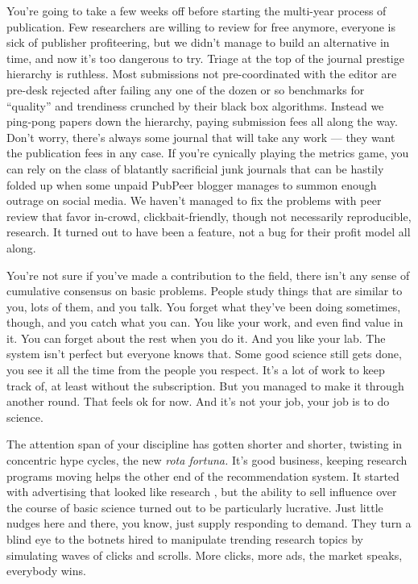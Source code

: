 You're going to take a few weeks off before starting the multi-year
process of publication. Few researchers are willing to review for free
anymore, everyone is sick of publisher profiteering, but we didn't
manage to build an alternative in time, and now it's too dangerous to
try. Triage at the top of the journal prestige hierarchy is ruthless.
Most submissions not pre-coordinated with the editor are pre-desk
rejected after failing any one of the dozen or so benchmarks for
``quality'' and trendiness crunched by their black box algorithms.
Instead we ping-pong papers down the hierarchy, paying submission fees
all along the way. Don't worry, there's always some journal that will
take any work --- they want the publication fees in any case. If you're
cynically playing the metrics game, you can rely on the class of
blatantly sacrificial junk journals that can be hastily folded up when
some unpaid PubPeer blogger manages to summon enough outrage on social
media. We haven't managed to fix the problems with peer review that
favor in-crowd, clickbait-friendly, though not necessarily reproducible,
research. It turned out to have been a feature, not a bug for their
profit model all along.

You're not sure if you've made a contribution to the field, there isn't
any sense of cumulative consensus on basic problems. People study things
that are similar to you, lots of them, and you talk. You forget what
they've been doing sometimes, though, and you catch what you can. You
like your work, and even find value in it. You can forget about the rest
when you do it. And you like your lab. The system isn't perfect but
everyone knows that. Some good science still gets done, you see it all
the time from the people you respect. It's a lot of work to keep track
of, at least without the subscription. But you managed to make it
through another round. That feels ok for now. And it's not your job,
your job is to do science.

The attention span of your discipline has gotten shorter and shorter,
twisting in concentric hype cycles, the new \emph{rota fortuna.} It's
good business, keeping research programs moving helps the other end of
the recommendation system. It started with advertising that looked like
research \citep{elsevier360AdvertisingSolutions} , but the ability
to sell influence over the course of basic science turned out to be
particularly lucrative. Just little nudges here and there, you know,
just supply responding to demand. They turn a blind eye to the botnets
hired to manipulate trending research topics by simulating waves of
clicks and scrolls. More clicks, more ads, the market speaks, everybody
wins.

